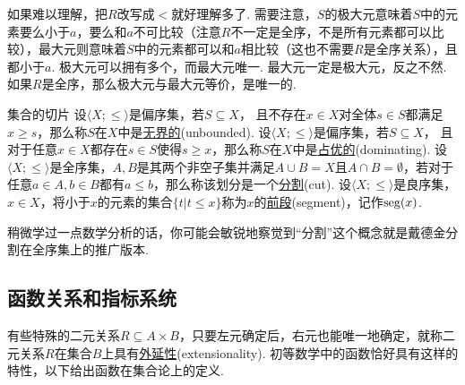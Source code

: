 \documentclass[main.tex]{subfiles}
\begin{document}
如果难以理解，把\(R\)改写成\(<\)就好理解多了. 需要注意，\(S\)的极大元意味着\(S\)中的元素要么小于\(a\)，要么和\(a\)不可比较（注意\(R\)不一定是全序，不是所有元素都可以比较），最大元则意味着\(S\)中的元素都可以和\(a\)相比较（这也不需要\(R\)是全序关系），且都小于\(a\). 极大元可以拥有多个，而最大元唯一. 最大元一定是极大元，反之不然. 如果\(R\)是全序，那么极大元与最大元等价，是唯一的. 

\begin{definition}{集合的切片}
    设\(\langle X; \leq \rangle\)是偏序集，若\(S \subseteq X\)，{\color{red} 且不存在\(x \in X\)对全体\(s \in S\)都满足\(x \geq s\)}，那么称\(S\)在\(X\)中是\uline{无界的}(unbounded). \newline
    设\(\langle X; \leq \rangle\)是偏序集，若\(S \subseteq X\)，{\color{red} 且对于任意\(x \in X\)都存在\(s \in S\)使得\(s \geq x\)}，那么称\(S\)在\(X\)中是\uline{占优的}(dominating). \newline
    设\(\langle X; \leq \rangle\)是全序集，\(A,B\)是其两个非空子集并满足\(A \cup B = X\)且\(A \cap B = \emptyset\)，若对于任意\(a \in A, b \in B\)都有\(a \leq b\)，那么称该划分是一个\uline{分割}(cut). \newline
    设\(\langle X; \leq \rangle\)是良序集，\(x \in X\)，将小于\(x\)的元素的集合\(\{t | t\leq x\}\)称为\(x\)的\uline{前段}(segment)，记作\({\rm seg}(x)\).
\end{definition}
稍微学过一点数学分析的话，你可能会敏锐地察觉到“分割”这个概念就是戴德金分割在全序集上的推广版本.
\subsection{函数关系和指标系统}

有些特殊的二元关系\(R \subseteq A \times B\)，只要左元确定后，右元也能唯一地确定，就称二元关系\(R\)在集合\(B\)上具有\uline{外延性}(extensionality). 初等数学中的函数恰好具有这样的特性，以下给出函数在集合论上的定义.
\end{document}
